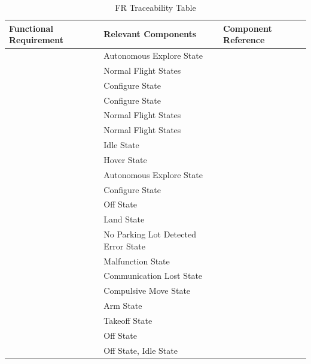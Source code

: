 \documentclass[12pt, titlepage]{article}
\begin{document}
\begin{table}[!h]
\begin{center}
\caption {FR Traceability Table}
\label{tab:FR_DesignTrace}
\begin{tabular}{ | m{2.5cm} | m{7.5cm} | m{7.5cm} | } 
\hline
Functional Requirement & Relevant Components & Component Reference \\
\hline
\nameref{GEN_001} & Autonomous Explore State & \nameref{FlightStates} \\ \hline
\nameref{GEN_002} & Normal Flight States & \nameref{FlightStates} \\ \hline
\nameref{GEN_003} & Configure State & \nameref{NonFlightStates} \\ \hline
\nameref{GEN_004} & Configure State & \nameref{NonFlightStates} \\ \hline
\nameref{GEN_005} & Normal Flight States & \nameref{FlightStates} \\ \hline
\nameref{GEN_006} & Normal Flight States & \nameref{FlightStates} \\ \hline
\nameref{STA_000} & Idle State & \nameref{NonFlightStates} \\ \hline
\nameref{STA_001} & Hover State & \nameref{FlightStates} \\ \hline
\nameref{STA_003} & Autonomous Explore State & \nameref{FlightStates} \\ \hline
\nameref{STA_004} & Configure State & \nameref{NonFlightStates} \\ \hline
\nameref{STA_005} & Off State & \nameref{NonFlightStates} \\ \hline
\nameref{STA_006} & Land State & \nameref{FlightStates} \\ \hline
\nameref{STA_008} & No Parking Lot Detected Error State & \nameref{ErrorStates} \\ \hline
\nameref{STA_009} & Malfunction State & \nameref{ErrorStates} \\ \hline
\nameref{STA_010} & Communication Lost State & \nameref{ErrorStates} \\ \hline
\nameref{STA_011} & Compulsive Move State & \nameref{FlightStates} \\ \hline
\nameref{STA_012} & Arm State & \nameref{FlightStates} \\ \hline
\nameref{STA_013} & Takeoff State & \nameref{FlightStates} \\ \hline
\nameref{TRANS_001} & Off State & \nameref{FlightStates} \\ \hline
\nameref{TRANS_002} & Off State, Idle State & \nameref{NonFlightStates} \\ \hline

\end{tabular}
\end{center}
\end{table}
\end{document}
